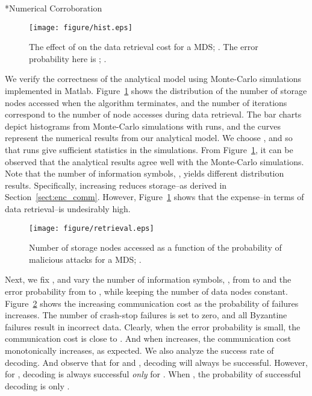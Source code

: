 \documentclass[10pt,journal,letterpaper,compsoc]{IEEEtran}
\makeatletter
\newcommand{\0}{{\bf 0}}
\renewcommand\paragraph{\@startsection{paragraph}{4}{\z@}{1.5ex plus .2ex minus .3ex}{-0em}{\normalsize\bf}}
\makeatother
\begin{document}
\paragraph*{Numerical Corroboration}
\label{sect:num}
\begin{figure}[thp]
\begin{center}
\texttt{[image: figure/hist.eps]}
\caption{The effect of  on the data retrieval cost for a  MDS; . The error probability here is ; . }
\label{fig:khat}
\end{center}
\end{figure}
We verify the correctness of the analytical model using Monte-Carlo simulations
implemented in Matlab. Figure~\ref{fig:khat} shows the distribution of the number of
storage nodes accessed when the algorithm terminates, and the number of iterations
correspond to the number of node accesses during data retrieval.
The bar charts depict 
histograms from Monte-Carlo simulations with  runs, and the curves
represent the numerical results from our analytical model. We choose ,  and  so that  runs give sufficient statistics in the simulations. From Figure~\ref{fig:khat},
it can be observed that the analytical results agree well with the Monte-Carlo simulations.
Note that the number of information symbols, , yields different distribution results.
Specifically, increasing  reduces storage--as derived in Section~\ref{sect:enc_comm}.
However, Figure~\ref{fig:khat} shows that the expense--in terms of data retrieval--is undesirably high.
\begin{figure}[thp]
\begin{center}
\texttt{[image: figure/retrieval.eps]} 
\caption{Number of storage nodes accessed as a function of the probability of malicious attacks for a MDS; .}
\label{fig:ret}
\end{center}
\end{figure}

Next, we fix , and vary the number of information symbols, , from
 to  and the error probability  from  to , while keeping the number
of data nodes constant.
Figure~\ref{fig:ret} shows the increasing communication cost as the
probability of failures increases. The number of crash-stop failures is set to
zero, and all Byzantine failures result in incorrect data.  Clearly, when the
error probability  is small, the communication cost is close to . And when  increases, the
communication cost monotonically increases, as expected. We also analyze the success rate of decoding. And observe
that for  and , decoding will always be successful. However, for , decoding is always successful \emph{only} for . When , the probability of successful decoding is only .
\end{document}
